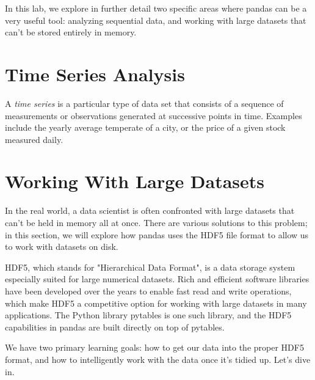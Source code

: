 
In this lab, we explore in further detail two specific areas where pandas can be a very useful tool:
analyzing sequential data, and working with large datasets that can't be stored entirely in memory.
\section*{Time Series Analysis}
A \emph{time series} is a particular type of data set that consists of a sequence of measurements or observations
generated at successive points in time. Examples include the yearly average temperate of a city, or
the price of a given stock measured daily.
\section*{Working With Large Datasets}
In the real world, a data scientist is often confronted with large datasets that can't be held in memory all at once.
There are various solutions to this problem; in this section, we will explore how pandas uses the HDF5 file format
to allow us to work with datasets on disk.

HDF5, which stands for "Hierarchical Data Format", is a data storage system especially suited for large numerical datasets.
Rich and efficient software libraries have been developed over the years to enable fast read and write operations,
which make HDF5 a competitive option for working with large datasets in many applications. The Python library pytables
is one such library, and the HDF5 capabilities in pandas are built directly on top of pytables.

We have two primary learning goals: how to get our data into the proper HDF5 format, and how to intelligently work with
the data once it's tidied up. Let's dive in.
